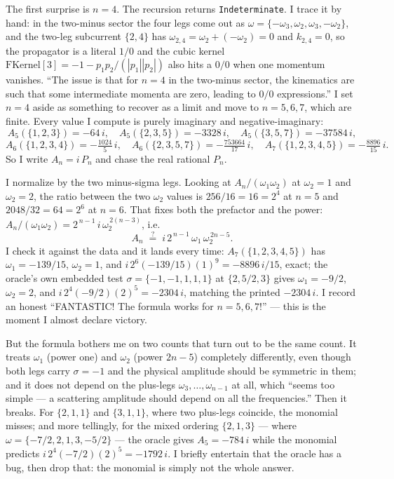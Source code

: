 \documentclass{article}
\begin{document}
The first surprise is $n=4$. The recursion returns \texttt{Indeterminate}. I
trace it by hand: in the two-minus sector the four legs come out as
$\omega=\{-\omega_3,\omega_2,\omega_3,-\omega_2\}$, and the two-leg subcurrent
$\{2,4\}$ has $\omega_{2,4}=\omega_2+(-\omega_2)=0$ and $k_{2,4}=0$, so the
propagator is a literal $1/0$ and the cubic kernel
$\mathrm{FKernel}[3]=-1-p_1p_2/(|p_1||p_2|)$ also hits a $0/0$ when one momentum
vanishes. ``The issue is that for $n=4$ in the two-minus sector, the kinematics
are such that some intermediate momenta are zero, leading to $0/0$ expressions.''
I set $n=4$ aside as something to recover as a limit and move to $n=5,6,7$, which
are finite. Every value I compute is purely imaginary and negative-imaginary:
\[
A_5(\{1,2,3\})=-64\,i,\quad A_5(\{2,3,5\})=-3328\,i,\quad A_5(\{3,5,7\})=-37584\,i,
\]
\[
A_6(\{1,2,3,4\})=-\tfrac{1024}{5}\,i,\quad
A_6(\{2,3,5,7\})=-\tfrac{753664}{17}\,i,\quad
A_7(\{1,2,3,4,5\})=-\tfrac{8896}{15}\,i .
\]
So I write $A_n=i\,P_n$ and chase the real rational $P_n$.

I normalize by the two minus-sigma legs. Looking at $A_n/(\omega_1\omega_2)$ at
$\omega_2=1$ and $\omega_2=2$, the ratio between the two $\omega_2$ values is
$256/16=16=2^4$ at $n=5$ and $2048/32=64=2^6$ at $n=6$. That fixes both the
prefactor and the power: $A_n/(\omega_1\omega_2)=2^{\,n-1}\,i\,\omega_2^{\,2(n-3)}$,
i.e.
\[
A_n \;\stackrel{?}{=}\; i\,2^{\,n-1}\,\omega_1\,\omega_2^{\,2n-5}.
\]
I check it against the data and it lands every time:
$A_7(\{1,2,3,4,5\})$ has $\omega_1=-139/15$, $\omega_2=1$, and
$i\,2^{6}(-139/15)(1)^9=-8896\,i/15$, exact; the oracle's own embedded test
$\sigma=\{-1,-1,1,1,1\}$ at $\{2,5/2,3\}$ gives $\omega_1=-9/2$, $\omega_2=2$, and
$i\,2^4(-9/2)(2)^5=-2304\,i$, matching the printed $-2304\,i$. I record an honest
``FANTASTIC! The formula works for $n=5,6,7$!'' --- this is the moment I almost
declare victory.

But the formula bothers me on two counts that turn out to be the same count. It
treats $\omega_1$ (power one) and $\omega_2$ (power $2n-5$) completely
differently, even though both legs carry $\sigma=-1$ and the physical amplitude
should be symmetric in them; and it does not depend on the plus-legs
$\omega_3,\dots,\omega_{n-1}$ at all, which ``seems too simple --- a scattering
amplitude should depend on all the frequencies.'' Then it breaks. For
$\{2,1,1\}$ and $\{3,1,1\}$, where two plus-legs coincide, the monomial misses;
and more tellingly, for the mixed ordering $\{2,1,3\}$ --- where
$\omega=\{-7/2,2,1,3,-5/2\}$ --- the oracle gives $A_5=-784\,i$ while the monomial
predicts $i\,2^4(-7/2)(2)^5=-1792\,i$. I briefly entertain that the oracle has a
bug, then drop that: the monomial is simply not the whole answer.
\end{document}
